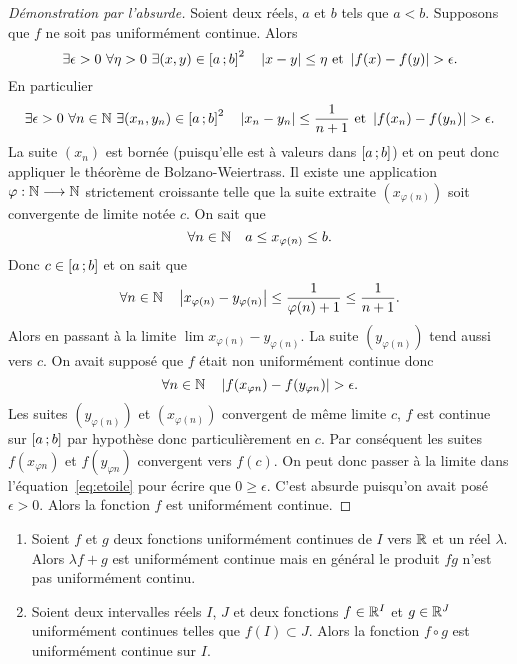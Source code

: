 \begin{proof}[Démonstration par l'absurde]
  Soient deux réels, $a$ et $b$ tels que $a<b$. Supposons que $f$ ne soit pas uniformément continue. Alors
  \begin{equation}
    \exists \epsilon > 0 \ \forall \eta > 0 \ \exists (x,y) \in \intervalleff{a}{b}^2 \quad \abs{x-y} \leq \eta \text{~et~} \abs{f(x)-f(y)} > \epsilon.
  \end{equation}
  En particulier
  \begin{equation}
    \exists \epsilon > 0 \ \forall n \in \N \ \exists (x_n,y_n) \in \intervalleff{a}{b}^2 \quad \abs{x_n-y_n} \leq \frac{1}{n+1} \text{~et~} \abs{f(x_n)-f(y_n)} > \epsilon.
  \end{equation}
  La suite $(x_n)$ est bornée (puisqu'elle est à valeurs dans $\left[ a \, ;  b \right]$) et on peut donc appliquer le théorème de Bolzano-Weiertrass. Il existe une application $\varphi : \mathbb{N} \longrightarrow \mathbb{N}$ strictement croissante telle que la suite extraite $(x_{\varphi(n)})$ soit convergente de limite notée $c$. On sait que
  \begin{equation}
    \forall n \in \mathbb{N} \quad a \leq x_{\varphi(n)} \leq b.
  \end{equation}
  Donc $c \in \left[ a \, ;  b \right]$ et on sait que
  \begin{equation}
    \forall n \in \mathbb{N} \quad \left\lvert x_{\varphi(n)}-y_{\varphi(n)}\right\rvert \leq \frac{1}{\varphi(n)+1} \leq \frac{1}{n+1}.
  \end{equation}
  Alors en passant à la limite $\lim x_{\varphi(n)}-y_{\varphi(n)}$. La suite $(y_{\varphi(n)})$ tend aussi vers $c$. On avait supposé que $f$ était non uniformément continue donc
  \begin{equation}\label{eq:etoile}
    \forall n \in \mathbb{N} \quad \left\lvert f(x_{\varphi{n}})-f(y_{\varphi{n}})\right\rvert > \epsilon.
  \end{equation}
  Les suites $(y_{\varphi(n)})$ et $(x_{\varphi(n)})$ convergent de même limite $c$, $f$ est continue sur $\left[ a \, ;  b \right]$ par hypothèse donc particulièrement en $c$. Par conséquent les suites $f(x_{\varphi{n}})$ et $f(y_{\varphi{n}})$ convergent vers $f(c)$. On peut donc passer à la limite dans l'équation~\ref{eq:etoile} pour écrire que $0 \geq \epsilon$. C'est absurde puisqu'on avait posé $\epsilon >0$. Alors la fonction $f$ est uniformément continue.
\end{proof}
\begin{prop}
  \begin{enumerate}
  \item Soient $f$ et $g$ deux fonctions uniformément continues de $I$ vers $\mathbb{R}$ et un réel $\lambda$. Alors $\lambda f +g$ est uniformément continue mais en général le produit $fg$ n'est pas uniformément continu.
  \item Soient deux intervalles réels $I$, $J$ et deux fonctions $f \in \mathbb{R}^I$ et $g\in \mathbb{R}^J$ uniformément continues telles que $f(I)\subset J$. Alors la fonction $f \circ g$ est uniformément continue sur $I$.
  \end{enumerate}
\end{prop}
